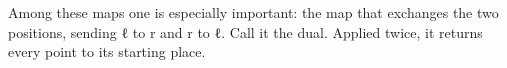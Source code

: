 \documentclass[11pt,a4paper]{book}
\def\texttt#1{#1}%
\begin{document}
\begin{code}%
\>[0]\AgdaSpace{}%
\AgdaSpace{}%
\<%
\\
\>[0]\AgdaSpace{}%
\AgdaSymbol{:}\AgdaSpace{}%
\AgdaSymbol{\{}\AgdaSpace{}%
\AgdaSpace{}%
\AgdaSymbol{:}\AgdaSpace{}%
\AgdaSymbol{\}}\AgdaSpace{}%
\AgdaSymbol{\{}\AgdaSpace{}%
\AgdaSymbol{:}\AgdaSpace{}%
\AgdaSpace{}%
\AgdaSymbol{\}}\AgdaSpace{}%
\AgdaSymbol{\{}\AgdaSpace{}%
\AgdaSymbol{:}\AgdaSpace{}%
\AgdaSpace{}%
\AgdaSymbol{\}}\AgdaSpace{}%
\AgdaSpace{}%
\AgdaSymbol{(}\AgdaSpace{}%
\AgdaSpace{}%
\AgdaSymbol{)}\AgdaSpace{}%
\AgdaSpace{}%
\AgdaSymbol{(}\AgdaSpace{}%
\AgdaSpace{}%
\AgdaSymbol{)}\AgdaSpace{}%
\AgdaSpace{}%
\AgdaSpace{}%
\AgdaSymbol{(}\AgdaSpace{}%
\AgdaSpace{}%
\AgdaSymbol{)}\<%
\\
\>[0]\AgdaSpace{}%
\AgdaSymbol{\{}\AgdaSpace{}%
\AgdaSymbol{=}\AgdaSpace{}%
\AgdaSymbol{\}}\AgdaSpace{}%
\AgdaSpace{}%
\AgdaSpace{}%
\AgdaSymbol{=}\AgdaSpace{}%
\AgdaSymbol{(}\AgdaSpace{}%
\AgdaSymbol{:}\AgdaSpace{}%
\AgdaSymbol{)}\AgdaSpace{}%
\AgdaSpace{}%
\AgdaSpace{}%
\AgdaSpace{}%
\AgdaSpace{}%
\AgdaSpace{}%
\<%
\\
%
\\[\AgdaEmptyExtraSkip]%
\>[0]\AgdaSpace{}%
\AgdaSymbol{:}\AgdaSpace{}%
\AgdaSymbol{\{}\AgdaSpace{}%
\AgdaSymbol{:}\AgdaSpace{}%
\AgdaSymbol{\}}\AgdaSpace{}%
\AgdaSpace{}%
\AgdaSpace{}%
\AgdaSpace{}%
\<%
\\
\>[0]\AgdaSpace{}%
\AgdaSpace{}%
\AgdaSymbol{=}\AgdaSpace{}%
\<%
\end{code}

Among these maps one is especially important: the map that exchanges the
two positions, sending \texttt{ℓ} to \texttt{r} and \texttt{r} to
\texttt{ℓ}. Call it the dual. Applied twice, it returns every point to its
starting place.
\end{document}
